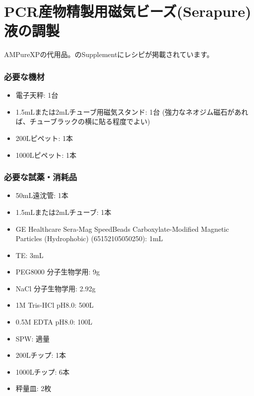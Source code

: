 \documentclass[titlepage,10pt,a4paper,uplatex]{jsbook}
\begin{document}
\section{PCR産物精製用磁気ビーズ(Serapure)液の調製}\label{makingSerapure}

AMPureXPの代用品。\citet{Rohland2012}のSupplementにレシピが掲載されています。

\subsubsection{必要な機材}
\begin{itemize}
\item 電子天秤: 1台
\item 1.5mLまたは2mLチューブ用磁気スタンド: 1台 (強力なネオジム磁石があれば、チューブラックの横に貼る程度でよい)
\item 200{\textmu}Lピペット: 1本
\item 1000{\textmu}Lピペット: 1本
\end{itemize}

\subsubsection{必要な試薬・消耗品}
\begin{itemize}
\item 50mL遠沈管: 1本
\item 1.5mLまたは2mLチューブ: 1本
\item GE Healthcare Sera-Mag SpeedBeads Carboxylate-Modified Magnetic Particles (Hydrophobic) (65152105050250): 1mL
\item TE: 3mL
\item PEG8000 分子生物学用: 9g
\item NaCl 分子生物学用: 2.92g
\item 1M Tris-HCl pH8.0: 500{\textmu}L
\item 0.5M EDTA pH8.0: 100{\textmu}L
\item SPW: 適量
\item 200{\textmu}Lチップ: 1本
\item 1000{\textmu}Lチップ: 6本
\item 秤量皿: 2枚
\end{itemize}
\end{document}
